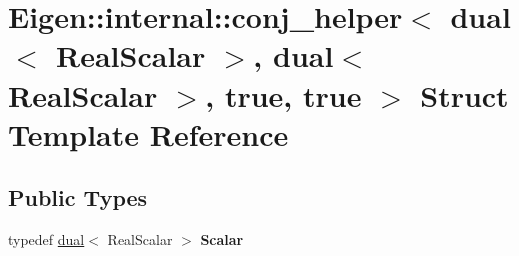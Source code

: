 \hypertarget{struct_eigen_1_1internal_1_1conj__helper_3_01dual_3_01_real_scalar_01_4_00_01dual_3_01_real_scala5ecec909c0c0ca9a1043b6a856d6abb}{\section{Eigen\-:\-:internal\-:\-:conj\-\_\-helper$<$ dual$<$ Real\-Scalar $>$, dual$<$ Real\-Scalar $>$, true, true $>$ Struct Template Reference}
\label{struct_eigen_1_1internal_1_1conj__helper_3_01dual_3_01_real_scalar_01_4_00_01dual_3_01_real_scala5ecec909c0c0ca9a1043b6a856d6abb}
}
\subsection*{Public Types}
\begin{DoxyCompactItemize}
\item 
\hypertarget{struct_eigen_1_1internal_1_1conj__helper_3_01dual_3_01_real_scalar_01_4_00_01dual_3_01_real_scala5ecec909c0c0ca9a1043b6a856d6abb_a3ee7e5e2bde6856509d68e163320af1a}{typedef \hyperlink{struct_d_r_d_s_p_1_1dual}{dual}$<$ Real\-Scalar $>$ {\bfseries Scalar}}\label{struct_eigen_1_1internal_1_1conj__helper_3_01dual_3_01_real_scalar_01_4_00_01dual_3_01_real_scala5ecec909c0c0ca9a1043b6a856d6abb_a3ee7e5e2bde6856509d68e163320af1a}

\end{DoxyCompactItemize}
